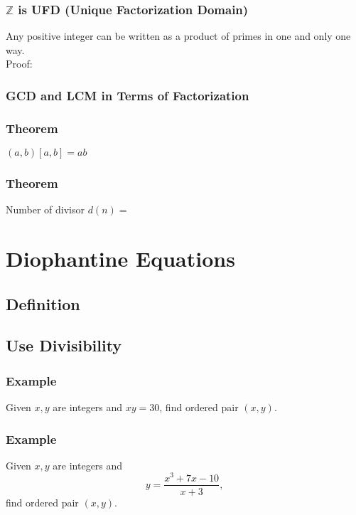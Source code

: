 \documentclass{article}
\begin{document}
\subsubsection{$\mathbb{Z}$ is UFD (Unique Factorization Domain)}
Any positive integer can be written as a product of primes in one and only one way.\\
Proof:
\vspace{50px}

\subsubsection{GCD and LCM in Terms of Factorization}
\vspace{50px}

\subsubsection{Theorem}
$(a,b)[a,b]=ab$
\vspace{50px}
\subsubsection{Theorem}
Number of divisor $d(n)=$


\vspace{50px}

\section{Diophantine Equations}
\subsection{Definition}
\vspace{20px}
\subsection{Use Divisibility}
\subsubsection{Example}
Given $x,y$ are integers and $xy=30$, find ordered pair $(x,y)$.
\pagebreak
\subsubsection{Example}
Given $x,y$ are integers and
$$y=\frac{x^3 + 7 x - 10}{x+3},$$
find ordered pair $(x,y)$.

\vspace{60px}
\end{document}
